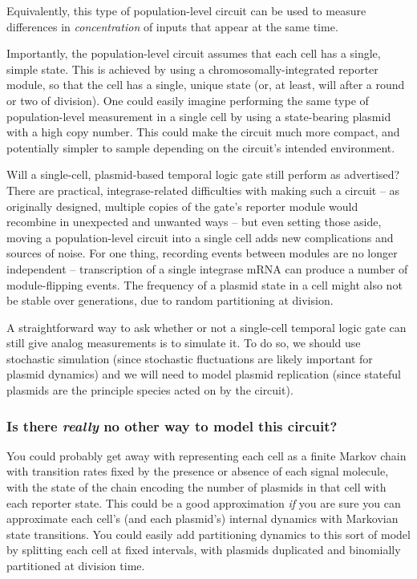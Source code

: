 \documentclass[preprint,12pt]{oldplainarticle}
\begin{document}
Equivalently, this type of population-level circuit can be used to measure differences in \emph{concentration} of inputs that appear at the same time. 

Importantly, the population-level circuit assumes that each cell has a single, simple state. This is achieved by using a chromosomally-integrated reporter module, so that the cell has a single, unique state (or, at least, will after a round or two of division). One could easily imagine performing the same type of population-level measurement in a single cell by using a state-bearing plasmid with a high copy number. This could make the circuit much more compact, and potentially simpler to sample depending on the circuit's intended environment. 

Will a single-cell, plasmid-based temporal logic gate still perform as advertised? There are practical, integrase-related difficulties with making such a circuit -- as originally designed, multiple copies of the gate's reporter module would recombine in unexpected and unwanted ways -- but even setting those aside, moving a population-level circuit into a single cell adds new complications and sources of noise. For one thing, recording events between modules are no longer independent -- transcription of a single integrase mRNA can produce a number of module-flipping events. The frequency of a plasmid state in a cell might also not be stable over generations, due to random partitioning at division. 

A straightforward way to ask whether or not a single-cell temporal logic gate can still give analog measurements is to simulate it. To do so, we should use stochastic simulation (since stochastic fluctuations are likely important for plasmid dynamics) and we will need to model plasmid replication (since stateful plasmids are the principle species acted on by the circuit). 
	
\subsubsection{Is there \emph{really} no other way to model this circuit?}

You could probably get away with representing each cell as a finite Markov chain with transition rates fixed by the presence or absence of each signal molecule, with the state of the chain encoding the number of plasmids in that cell with each reporter state. This could be a good approximation \textit{if} you are sure you can approximate each cell's (and each plasmid's) internal dynamics with Markovian state transitions. You could easily add partitioning dynamics to this sort of model by splitting each cell at fixed intervals, with plasmids duplicated and binomially partitioned at division time.
\end{document}
